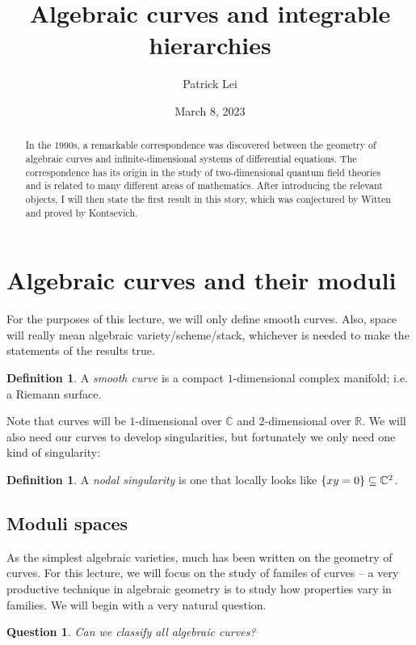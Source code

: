 \documentclass{amsart}
\title{Algebraic curves and integrable hierarchies}
\author{Patrick Lei}
\date{March 8, 2023}
\newtheorem{quest}[thm]{Question}
\theoremstyle{definition}
\newtheorem{defn}[thm]{Definition}
\theoremstyle{remark}
\theoremstyle{plain}
\theoremstyle{definition}
\theoremstyle{remark}
\newcommand{\R}{\mathbb{R}}
\newcommand{\C}{\mathbb{C}}
\newcommand{\1}{\mathbf{1}}
\newcommand{\2}{\mathbf{2}}
\newcommand{\3}{\mathbf{3}}
\begin{document}
    
\maketitle

\begin{abstract}
    In the 1990s, a remarkable correspondence was discovered between the geometry of algebraic curves and infinite-dimensional systems of differential equations. The correspondence has its origin in the study of two-dimensional quantum field theories and is related to many different areas of mathematics. After introducing the relevant objects, I will then state the first result in this story, which was conjectured by Witten and proved by Kontsevich.
\end{abstract}

\section{Algebraic curves and their moduli}

For the purposes of this lecture, we will only define smooth curves. Also, space will really mean algebraic variety/scheme/stack, whichever is needed to make the statements of the results true.

\begin{defn}
    A \textit{smooth curve} is a compact $1$-dimensional complex manifold; i.e. a Riemann surface.
\end{defn}

Note that curves will be $1$-dimensional over $\C$ and $2$-dimensional over $\R$. We will also need our curves to develop singularities, but fortunately we only need one kind of singularity:

\begin{defn}
    A \textit{nodal singularity} is one that locally looks like $\qty{xy = 0} \subseteq \C^2$.
\end{defn}

\subsection{Moduli spaces}

As the simplest algebraic varieties, much has been written on the geometry of curves. For this lecture, we will focus on the study of familes of curves -- a very productive technique in algebraic geometry is to study how properties vary in families. We will begin with a very natural question.

\begin{quest}
    Can we classify all algebraic curves?
\end{quest}
\end{document}
